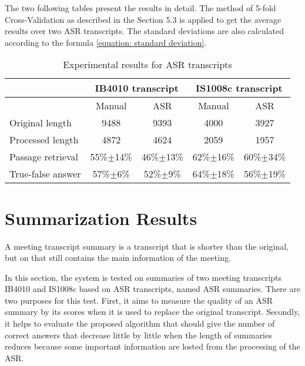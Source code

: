 The two following tables present the results in detail. The method of 5-fold Cross-Validation as described in the Section 5.3 is applied to get the average results over two ASR transcripts. The standard deviations are also calculated according to the formula \ref{equation: standard deviation}.

\begin{table}[htbp]
\caption{Experimental results for ASR transcripts}
\begin{tabular}{|l|c|c|c|c|}
\hline
\multicolumn{1}{|c|}{} & \multicolumn{ 2}{c|}{IB4010 transcript} & \multicolumn{ 2}{c|}{IS1008c transcript} \\ \hline
\multicolumn{1}{|c|}{} & Manual & ASR & Manual & ASR \\ \hline
Original length & 9488 & 9393 & 4000 & 3927 \\ \hline
Processed length & 4872 & 4624 & 2059 & 1957 \\ \hline
Passage retrieval & 55\%\ensuremath{\pm}14\% & 46\%\ensuremath{\pm}13\% & 62\%\ensuremath{\pm}16\% & 60\%\ensuremath{\pm}34\% \\ \hline
True-false answer & 57\%\ensuremath{\pm}6\% & 52\%\ensuremath{\pm}9\% & 64\%\ensuremath{\pm}18\% & 56\%\ensuremath{\pm}19\% \\ \hline
\end{tabular}
\label{results for ASR transcripts}
\end{table}



\section{Summarization Results}

A meeting transcript summary is a transcript that is shorter than the original, but on that still contains the main information of the meeting.

In this section, the system is tested on summaries of two meeting transcripts IB4010 and IS1008c based on ASR transcripts, named ASR summaries. There are two purposes for this test. First, it aims to measure the quality of an ASR summary by its scores when it is used to replace the original transcript. Secondly, it helps to evaluate the proposed algorithm that should give the number of correct answers that decrease little by little when the length of summaries reduces because some important information are losted from the processing of the ASR.

